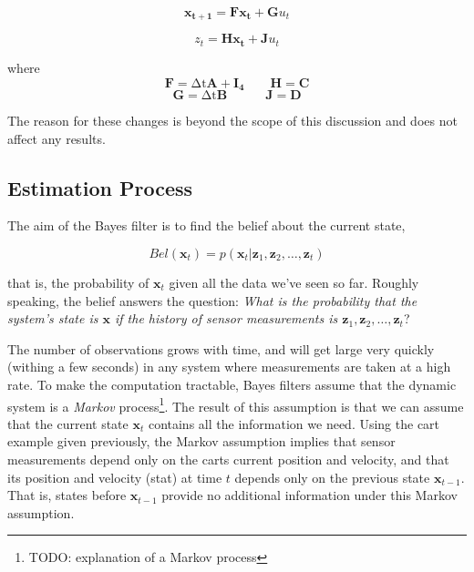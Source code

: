 \begin{equation}
\mathbf{x_{t+1}} = \mathbf{F}\mathbf{x_{t}} + \mathbf{G}u_{t}
\end{equation}

\begin{equation}
z_{t} = \mathbf{H}\mathbf{x_{t}} + \mathbf{J}u_{t}
\end{equation}

where
\begin{equation*}
    \mathbf{F} = \mathrm{\Delta t}\mathbf{A} + \mathbf{I_{4}}
    \quad\quad\mathbf{H} = \mathbf{C}
\end{equation*}
\begin{equation*}
\mathbf{G} = \mathrm{\Delta t}\mathbf{B}
\quad\quad\quad\mathbf{J} = \mathbf{D}
\end{equation*}

The reason for these changes is beyond the scope of this discussion and does
not affect any results.

\subsection{Estimation Process}
The aim of the Bayes filter is to find the belief about the current state,

\begin{equation}
Bel(\mathbf{x}_{t}) = p(\mathbf{x}_{t} | \mathbf{z}_{1}, \mathbf{z}_{2}, \dots
, \mathbf{z}_{t})
\end{equation}

that is, the probability of $\mathbf{x}_{t}$ given all the data we've seen so far.
Roughly speaking, the belief answers the question: \emph{What is the probability
that the system's state is $\mathbf{x}$ if the history of sensor measurements is
$\mathbf{z}_{1}, \mathbf{z}_{2}, \dots, \mathbf{z}_{t}$}?

The number of observations grows with time, and will get large very quickly
(withing a few seconds) in any system where measurements are taken at a high rate.
To make the computation tractable,
Bayes filters assume that the dynamic system is a \emph{Markov} process\footnote{TODO:
explanation of a Markov process}. The result of this assumption is that we can
assume that the
current state $\mathbf{x}_{t}$ contains all the information we need. Using
the cart example given previously, the Markov assumption implies that sensor measurements
depend only on the carts current position and velocity, and that its position
and velocity (stat) at
time $t$ depends only on the previous state $\mathbf{x}_{t-1}$. That is, states
before $\mathbf{x}_{t-1}$ provide no additional information under this Markov
assumption.

